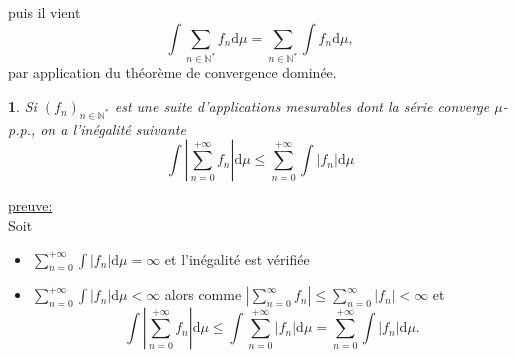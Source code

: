 \documentclass[8pt,notheorems]{beamer}
\def \N{\mathbb N}
\newtheorem{prop}{\translate{Proposition}}
\theoremstyle{definition}
\theoremstyle{example}
\theoremstyle{mystyle}
\theoremstyle{plain}
\begin{document}
\begin{frame}[allowframebreaks]
$$$$
puis il vient 
$$
\int \sum_{n\in\N^\ast} f_n \text{d}\mu=\sum_{n\in\N^\ast}\int f_n\text{d}\mu,
$$
par application du théorème de convergence dominée. 
\begin{prop}
Si $(f_n)_{n\in\N^\ast}$ est une suite d'applications mesurables dont la série converge $\mu$-p.p., on a l'inégalité suivante 
$$
\int\left|\sum_{n = 0}^{+\infty}f_n\right|\text{d}\mu\leq \sum_{n = 0}^{+\infty}\int|f_n|\text{d}\mu
$$
\end{prop}
\underline{preuve:}\\
Soit 
\begin{itemize}
\item $\sum_{n = 0}^{+\infty}\int|f_n|\text{d}\mu=\infty$ et l'inégalité est vérifiée
\item $\sum_{n = 0}^{+\infty}\int|f_n|\text{d}\mu<\infty$ alors comme $\left|\sum_{n=0}^{\infty}f_n\right|\leq\sum_{n=0}^{\infty}|f_n| <\infty$ et 
$$
\int\left|\sum_{n = 0}^{+\infty}f_n\right|\text{d}\mu\leq \int\sum_{n = 0}^{+\infty}|f_n|\text{d}\mu =\sum_{n = 0}^{+\infty}\int|f_n|\text{d}\mu. 
$$
\end{itemize}
\end{frame}
\end{document}
